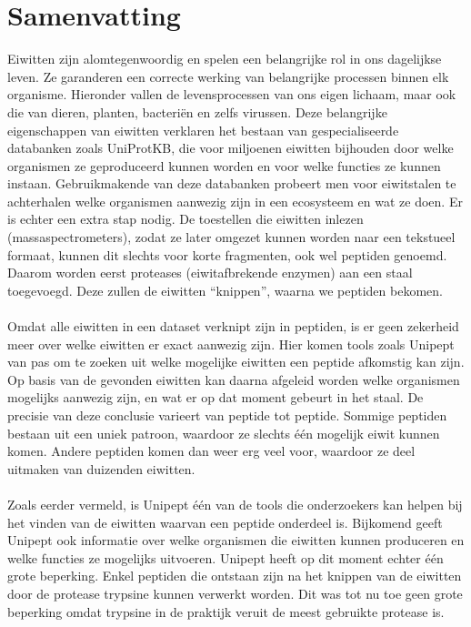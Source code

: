 \chapter*{Samenvatting}
Eiwitten zijn alomtegenwoordig en spelen een belangrijke rol in ons dagelijkse leven.
Ze garanderen een correcte werking van belangrijke processen binnen elk organisme.
Hieronder vallen de levensprocessen van ons eigen lichaam, maar ook die van dieren, planten, bacteriën en zelfs virussen.
Deze belangrijke eigenschappen van eiwitten verklaren het bestaan van gespecialiseerde databanken zoals UniProtKB, die voor miljoenen eiwitten bijhouden door welke organismen ze geproduceerd kunnen worden en voor welke functies ze kunnen instaan.
Gebruikmakende van deze databanken probeert men voor eiwitstalen te achterhalen welke organismen aanwezig zijn in een ecosysteem en wat ze doen.
Er is echter een extra stap nodig.
De toestellen die eiwitten inlezen (massaspectrometers), zodat ze later omgezet kunnen worden naar een tekstueel formaat, kunnen dit slechts voor korte fragmenten, ook wel peptiden genoemd.
Daarom worden eerst proteases (eiwitafbrekende enzymen) aan een staal toegevoegd.
Deze zullen de eiwitten ``knippen'', waarna we peptiden bekomen.
\\ \\
Omdat alle eiwitten in een dataset verknipt zijn in peptiden, is er geen zekerheid meer over welke eiwitten er exact aanwezig zijn.
Hier komen tools zoals Unipept van pas om te zoeken uit welke mogelijke eiwitten een peptide afkomstig kan zijn.
Op basis van de gevonden eiwitten kan daarna afgeleid worden welke organismen mogelijks aanwezig zijn, en wat er op dat moment gebeurt in het staal.
De precisie van deze conclusie varieert van peptide tot peptide.
Sommige peptiden bestaan uit een uniek patroon, waardoor ze slechts één mogelijk eiwit kunnen komen.
Andere peptiden komen dan weer erg veel voor, waardoor ze deel uitmaken van duizenden eiwitten.
\\ \\
Zoals eerder vermeld, is Unipept één van de tools die onderzoekers kan helpen bij het vinden van de eiwitten waarvan een peptide onderdeel is.
Bijkomend geeft Unipept ook informatie over welke organismen die eiwitten kunnen produceren en welke functies ze mogelijks uitvoeren.
Unipept heeft op dit moment echter één grote beperking.
Enkel peptiden die ontstaan zijn na het knippen van de eiwitten door de protease trypsine kunnen verwerkt worden.
Dit was tot nu toe geen grote beperking omdat trypsine in de praktijk veruit de meest gebruikte protease is.
